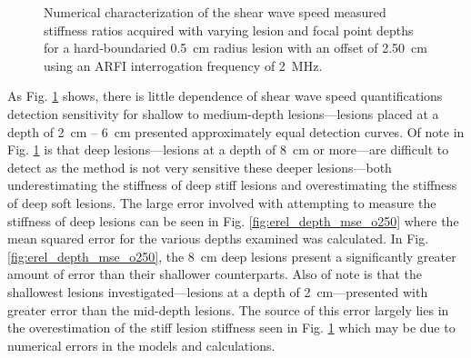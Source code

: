 			\begin{figure}[!htb]
				\centering
				\caption[Numerical characterization of shear wave speed measured stiffness ratio with changing lesion depth]{Numerical characterization of the shear wave speed measured stiffness ratios acquired with varying lesion and focal point depths for a hard-boundaried \SI{0.5}{cm} radius lesion with an offset of \SI{2.50}{\cm} using an ARFI interrogation frequency of \SI{2}{\MHz}.}
				\label{fig:erel_depth_o250}
			\end{figure}

			As Fig. \ref{fig:erel_depth_o250} shows, there is little dependence of shear wave speed quantifications detection sensitivity for shallow to medium-depth lesions---lesions placed at a depth of \SI{2}{\cm} -- \SI{6}{\cm} presented approximately equal detection curves. Of note in Fig. \ref{fig:erel_depth_o250} is that deep lesions---lesions at a depth of \SI{8}{\cm} or more---are difficult to detect as the method is not very sensitive these deeper lesions---both underestimating the stiffness of deep stiff lesions and overestimating the stiffness of deep soft lesions. The large error involved with attempting to measure the stiffness of deep lesions can be seen in Fig. \ref{fig:erel_depth_mse_o250} where the mean squared error for the various depths examined was calculated. In Fig. \ref{fig:erel_depth_mse_o250}, the \SI{8}{\cm} deep lesions present a significantly greater amount of error than their shallower counterparts. Also of note is that the shallowest lesions investigated---lesions at a depth of \SI{2}{\cm}---presented with greater error than the mid-depth lesions. The source of this error largely lies in the overestimation of the stiff lesion stiffness seen in Fig. \ref{fig:erel_depth_o250} which may be due to numerical errors in the models and calculations.

